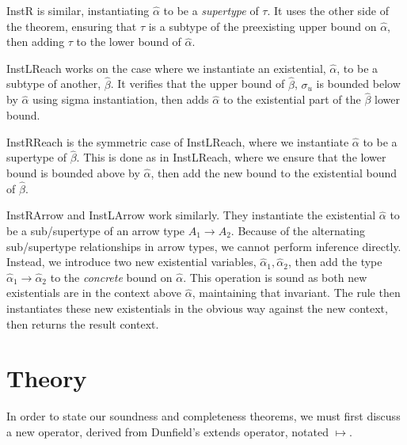 \documentclass{sig-alternate}
\newcommand{\alphahat}{\hat{\alpha}}
\newcommand{\betahat}{\hat{\beta}}
\newcommand{\topbound}{\sigma_{u}}
\begin{document}
InstR is similar, instantiating $\alphahat$ to be a \emph{supertype} of $\tau$. It uses the other side of the theorem, ensuring that $\tau$ is a subtype of the preexisting upper bound on $\alphahat$, then adding $\tau$ to the lower bound of $\alphahat$.

InstLReach works on the case where we instantiate an existential, $\alphahat$, to be a subtype of another, $\betahat$. It verifies that the upper bound of $\betahat$, $\topbound$ is bounded below by $\alphahat$ using sigma instantiation, then adds $\alphahat$ to the existential part of the $\betahat$ lower bound.

InstRReach is the symmetric case of InstLReach, where we instantiate $\alphahat$ to be a supertype of $\betahat$. This is done as in InstLReach, where we ensure that the lower bound is bounded above by $\alphahat$, then add the new bound to the existential bound of $\betahat$.

InstRArrow and InstLArrow work similarly. They instantiate the existential $\alphahat$ to be a sub/supertype of an arrow type $A_1 \rightarrow A_2$. Because of the alternating sub/supertype relationships in arrow types, we cannot perform inference directly. Instead, we introduce two new existential variables, $\alphahat_1, \alphahat_2$, then add the type $\alphahat_1\rightarrow\alphahat_2$ to the \emph{concrete} bound on $\alphahat$. This operation is sound as both new existentials are in the context above $\alphahat$, maintaining that invariant. The rule then instantiates these new existentials in the obvious way against the new context, then returns the result context. 

\section{Theory}
In order to state our soundness and completeness theorems, we must first discuss a new operator, derived from Dunfield's extends operator, notated $\mapsto$. 




\end{document}
